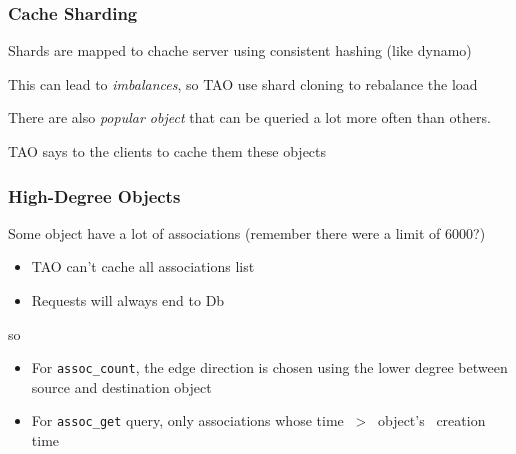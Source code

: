 \begin{frame}[c]\frametitle{Cache Sharding}
    Shards are mapped to chache server using consistent hashing (like dynamo)

    This can lead to \emph{imbalances}, so TAO use shard cloning to rebalance the load

    There are also \emph{popular object} that can be queried a lot more often than others.

    TAO says to the clients to cache them these objects
\end{frame}

\begin{frame}[fragile]\frametitle{High-Degree Objects}
    Some object have a lot of associations (remember there were a limit of 6000?)
    \begin{itemize}
    	\item TAO can't cache all associations list
    	\item Requests will always end to Db
    \end{itemize}
    so
    \begin{itemize}
    	\item For \verb!assoc_count!, the edge direction is chosen using the lower degree between source and destination object
    	\item For \verb!assoc_get! query, only associations whose time~ >~ object's ~creation~ time
    \end{itemize}




\end{frame}